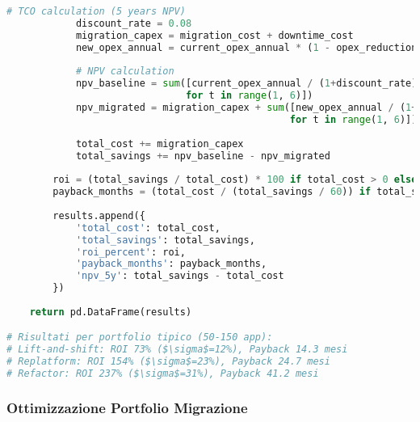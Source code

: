 \begin{lstlisting}[language=Python, caption=Simulazione Monte Carlo TCO Cloud Migration]
            # TCO calculation (5 years NPV)
            discount_rate = 0.08
            migration_capex = migration_cost + downtime_cost
            new_opex_annual = current_opex_annual * (1 - opex_reduction)
            
            # NPV calculation
            npv_baseline = sum([current_opex_annual / (1+discount_rate)**t 
                               for t in range(1, 6)])
            npv_migrated = migration_capex + sum([new_opex_annual / (1+discount_rate)**t 
                                                 for t in range(1, 6)])
            
            total_cost += migration_capex
            total_savings += npv_baseline - npv_migrated
        
        roi = (total_savings / total_cost) * 100 if total_cost > 0 else 0
        payback_months = (total_cost / (total_savings / 60)) if total_savings > 0 else np.inf
        
        results.append({
            'total_cost': total_cost,
            'total_savings': total_savings,
            'roi_percent': roi,
            'payback_months': payback_months,
            'npv_5y': total_savings - total_cost
        })
    
    return pd.DataFrame(results)

# Risultati per portfolio tipico (50-150 app):
# Lift-and-shift: ROI 73% ($\sigma$=12%), Payback 14.3 mesi
# Replatform: ROI 154% ($\sigma$=23%), Payback 24.7 mesi  
# Refactor: ROI 237% ($\sigma$=31%), Payback 41.2 mesi
\end{lstlisting}

\subsubsection{Ottimizzazione Portfolio Migrazione}

